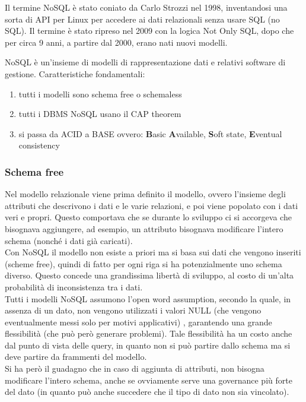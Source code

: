 Il termine NoSQL è stato coniato da Carlo Strozzi nel 1998, inventandosi una sorta di API per Linux per accedere ai dati relazionali senza usare SQL (no SQL). Il termine è stato ripreso nel 2009 con la logica Not Only SQL, dopo che per circa 9 anni, a partire dal 2000, erano nati nuovi modelli.\hfill 

NoSQL è un'insieme di modelli di rappresentazione dati e relativi software di gestione. 
Caratteristiche fondamentali:
\begin{enumerate}
    \item tutti i modelli sono schema free o schemaless
    \item tutti i DBMS NoSQL usano il CAP theorem
    \item si passa da ACID a BASE ovvero: \textbf{B}asic \textbf{A}vailable, \textbf{S}oft state, \textbf{E}ventual consistency
\end{enumerate}

\subsubsection{Schema free}
Nel modello relazionale viene prima definito il modello, ovvero l’insieme degli attributi che descrivono i dati e le varie relazioni, e poi viene popolato con i dati veri e propri. Questo comportava che se durante lo sviluppo ci si accorgeva che bisognava aggiungere, ad esempio, un attributo bisognava modificare l’intero schema (nonché i dati già caricati). \\

Con NoSQL il modello non esiste a priori ma si basa sui dati che vengono inseriti (scheme free), quindi di fatto per ogni riga si ha potenzialmente uno schema diverso. Questo concede una grandissima libertà di sviluppo, al costo di un’alta probabilità di inconsistenza tra i dati.  \\
Tutti i modelli NoSQL assumono l’open word assumption, secondo la quale, in assenza di un dato, non vengono utilizzati i valori NULL  (che vengono eventualmente messi solo per motivi applicativi) , garantendo una grande flessibilità (che può però generare problemi). Tale flessibilità ha un costo anche dal punto di vista delle query, in quanto non si può partire dallo schema ma si deve partire da frammenti del modello. \\ 
Si ha però il guadagno che in caso di aggiunta di attributi, non bisogna modificare l’intero schema, anche se ovviamente serve una governance più forte del dato (in quanto può anche succedere che il tipo di dato non sia vincolato).

